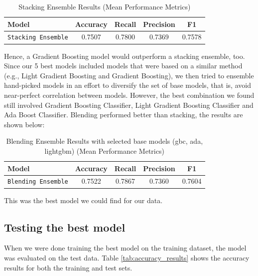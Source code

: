 \documentclass[a4paper,12pt]{article}
\begin{document}
\begin{table}[H]
    \centering
    \begin{tabular}{l c c c c}
    \toprule
    \textbf{Model} & \textbf{Accuracy} & \textbf{Recall} & \textbf{Precision} & \textbf{F1} \\
    \midrule
    \texttt{Stacking Ensemble} & 0.7507 & 0.7800 & 0.7369 & 0.7578 \\
    \bottomrule
    \end{tabular}
    \caption{Stacking Ensemble Results (Mean Performance Metrics)}
    \label{tab:stacking_performance}
\end{table}
    
Hence, a Gradient Boosting model would outperform a stacking ensemble, too.
Since our 5 best models included models that were based on a similar method (e.g., Light Gradient Boosting 
and Gradient Boosting), we then tried to ensemble hand-picked models in an effort to diversify the set of
base models, that is, avoid near-perfect correlation between models. However, the best combination we found still 
involved Gradient Boosting Classifier, Light Gradient Boosting Classifier and Ada Boost Classifier.
Blending performed better than stacking, the results are shown below:

\begin{table}[H]
    \centering
    \begin{tabular}{l c c c c}
    \toprule
    \textbf{Model} & \textbf{Accuracy} & \textbf{Recall} & \textbf{Precision} & \textbf{F1} \\
    \midrule
    \texttt{Blending Ensemble} & 0.7522 & 0.7867 & 0.7360 & 0.7604 \\
    \bottomrule
    \end{tabular}
    \caption{Blending Ensemble Results with selected base models (gbc, ada, lightgbm) (Mean Performance Metrics)}
    \label{tab:blending_performance_handpicked}
\end{table}

This was the best model we could find for our data.


\subsection{Testing the best model}

When we were done training the best model on the training dataset, the model was evaluated on the test data.
Table \ref{tab:accuracy_results} shows the accuracy results for both the training and test sets.
\end{document}
